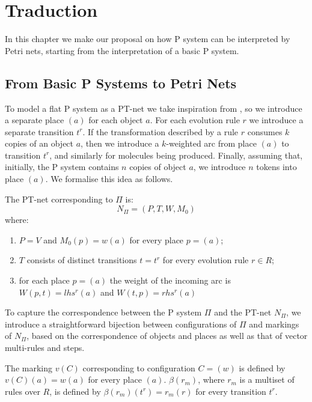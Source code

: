 \chapter{Traduction}

In this chapter we make our proposal on how P system can be interpreted by Petri nets, starting from the interpretation of a basic P system.

\section{From Basic P Systems to Petri Nets}
\label{sec:basic_p_to_pt}

To model a flat P system as a PT-net we take inspiration from \cite{kleijn2008petri}, so we introduce a separate place $(a)$ for each object $a$. 
For each evolution rule $r$ we introduce a separate transition $t^r$.
If the transformation described by a rule $r$ consumes $k$ copies of an object $a$, then we introduce a $k$-weighted arc from place $(a)$ to transition $t^r$, and similarly for molecules being produced.
Finally, assuming that, initially, the P system contains $n$ copies of object $a$, we introduce $n$ tokens into place $(a)$.
We formalise this idea as follows.

\begin{definition}
\label{def:def_tr_basic}
The PT-net corresponding to $\Pi$ is:
\[ N_\Pi = (P,T,W,M_0) \]
where:
\begin{enumerate}
    \item $P=V$ and $M_0(p)=w(a)$ for every place $p=(a)$;
    \item $T$ consists of distinct transitions $t=t^r$ for every evolution rule $r \in R$;
    \item for each place $p=(a)$ the weight of the incoming arc is $W(p,t)=lhs^r(a)$ and 
    $W(t,p)=rhs^r(a)$
\end{enumerate}
\end{definition}

To capture the correspondence between the P system $\Pi$ and the PT-net $N_\Pi$, we introduce a straightforward bijection between configurations of $\Pi$ and markings of $N_\Pi$, based on the correspondence of objects and places as well as that of vector multi-rules and steps.

\begin{definition}
\label{def:map_conf}
The marking $v(C)$ corresponding to configuration $C=(w)$ is defined by $v(C)(a)=w(a)$ for every place $(a)$.   
$\beta(r_m)$, where $r_m$ is a multiset of rules over $R$, is defined by 
$\beta(r_m)(t^r)=r_m(r)$ for every transition $t^r$.  
\end{definition}

